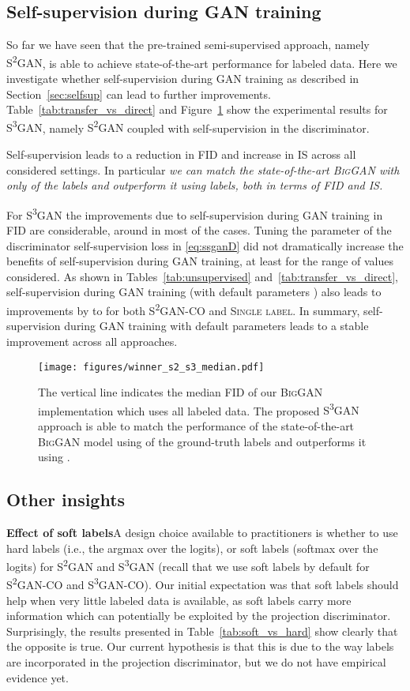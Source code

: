 \documentclass{article}
\newcommand{\cotrainSS}{\textsc{S\textsuperscript{2}GAN-CO}}
\newcommand{\cotrainSSS}{\textsc{S\textsuperscript{3}GAN-CO}}
\newcommand{\tranSS}{\textsc{S\textsuperscript{2}GAN}}
\newcommand{\tranSSS}{\textsc{S\textsuperscript{3}GAN}}
\newcommand{\slabels}{\textsc{Single label}}
\newcommand{\biggan}{\textsc{BigGAN}}
\begin{document}
\subsection{Self-supervision during GAN training}
So far we have seen that the pre-trained semi-supervised approach, namely \tranSS{}, is able to achieve state-of-the-art performance for  labeled data. Here we investigate whether self-supervision during GAN training as described in Section~\ref{sec:selfsup} can lead to further improvements. Table~\ref{tab:transfer_vs_direct} and Figure~\ref{fig:barwinner} show the experimental results for \tranSSS{}, namely \tranSS{} coupled with self-supervision in the discriminator.

Self-supervision leads to a reduction in FID and increase in IS across all considered settings. In particular \emph{we can match the state-of-the-art \biggan{} with only  of the labels and outperform it using  labels, both in terms of FID and IS.}

For \tranSSS{} the improvements due to self-supervision during GAN training in FID are considerable, around  in most of the cases. Tuning the parameter  of the discriminator self-supervision loss in \eqref{eq:ssganD} did not dramatically increase the benefits of self-supervision during GAN training, at least for the range of values considered. 
As shown in Tables~\ref{tab:unsupervised} and~\ref{tab:transfer_vs_direct}, self-supervision during GAN training (with default parameters ) also leads to improvements by  to  for both \cotrainSS{} and \slabels{}. In summary, self-supervision during GAN training with default parameters leads to a stable improvement across all approaches.

\begin{figure}[t]
\vspace{0.5cm}
\centering
\texttt{[image: figures/winner\_s2\_s3\_median.pdf]}
\caption{\label{fig:barwinner}The vertical line indicates the median FID of our \biggan{} implementation which uses all labeled data. The proposed \tranSSS{} approach is able to match the performance of the state-of-the-art \biggan{} model using  of the ground-truth labels and outperforms it using .} 
\end{figure}

\subsection{Other insights} \label{sec:otherinsights}
\textbf{Effect of soft labels}\quad A design choice available to practitioners is whether to use hard labels (i.e., the argmax over the logits), or soft labels (softmax over the logits) for \tranSS{} and \tranSSS{} (recall that we use soft labels by default for \cotrainSS{} and \cotrainSSS{}). Our initial expectation was that soft labels should help when very little labeled data is available, as soft labels carry more information which can potentially be exploited by the projection discriminator. Surprisingly, the results presented in Table~\ref{tab:soft_vs_hard} show clearly that the opposite is true. Our current hypothesis is that this is due to the way labels are incorporated in the projection discriminator, but we do not have empirical evidence yet.
\end{document}
